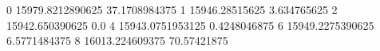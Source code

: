 0 15979.8212890625 37.1708984375
1 15946.28515625 3.634765625
2 15942.650390625 0.0
4 15943.0751953125 0.4248046875
6 15949.2275390625 6.5771484375
8 16013.224609375 70.57421875
